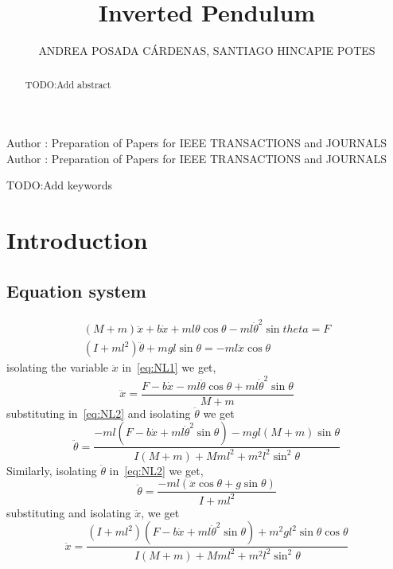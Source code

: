 \documentclass{ieeeaccess}
\begin{document}

\title{Inverted Pendulum}
\author{\uppercase{Andrea Posada Cárdenas},
  \uppercase{Santiago Hincapie Potes}}
\address[1]{Mathematical Engineering Student, Universidad EAFIT,
  Medellin, Colombia (e-mail: aposad31@eafit.edu.co)}
\address[2]{Mathematical Engineering Student, Universidad EAFIT,
  Medellin, Colombia (e-mail: shinca12@eafit.edu.co)}

\markboth
{Author \headeretal: Preparation of Papers for IEEE TRANSACTIONS and JOURNALS}
{Author \headeretal: Preparation of Papers for IEEE TRANSACTIONS and JOURNALS}


\begin{abstract}
  TODO:Add abstract
\end{abstract}

\begin{keywords}
  TODO:Add keywords
\end{keywords}

\titlepgskip=-15pt

\maketitle

\section{Introduction}
\label{sec:introduction}

\subsection{Equation system}
\begin{align}
  (M + m)\ddot{x} + b\dot{x} + ml\theta\cos{\theta} - ml\dot{\theta}^2\sin{theta}
     = F \label{eq:NL1} \\
  (I + ml^2)\ddot{\theta} + mgl\sin{\theta} = -ml\ddot{x}\cos{\theta} \label{eq:NL2}
\end{align}
isolating the variable $\ddot{x}$ in~\ref{eq:NL1} we get,
\[
  \ddot{x} = \frac{F - b\dot{x} - ml\ddot{\theta}\cos{\theta} + ml\dot{\theta}^2\sin{\theta}}{M + m}
\]
substituting in~\ref{eq:NL2} and isolating $\ddot{\theta}$ we get
\begin{equation}
  \label{eq:NLddth}
  \ddot{\theta} = \frac{-ml(F - b\dot{x} + ml\dot{\theta}^2\sin{\theta}) - mgl(M + m)\sin{\theta}}
       {I(M + m) + Mml^2 + m^2l^2\sin^2{\theta}}
\end{equation}
Similarly, isolating $\ddot{\theta}$ in~\ref{eq:NL2} we get,
\[
  \ddot{\theta} = \frac{-ml(\ddot{x}\cos{\theta} + g\sin{\theta})}{I + ml^2}
\]
substituting and isolating $\ddot{x}$, we get
\begin{equation}
  \label{eq:NLddx}
  \ddot{x} = \frac{(I + ml^2)(F - b\dot{x} + ml\dot{\theta}^2\sin{\theta})
    + m^2gl^2\sin{\theta}\cos{\theta}}{I(M + m) + Mml^2 + m^2l^2\sin^2{\theta}}
\end{equation}
\end{document}
